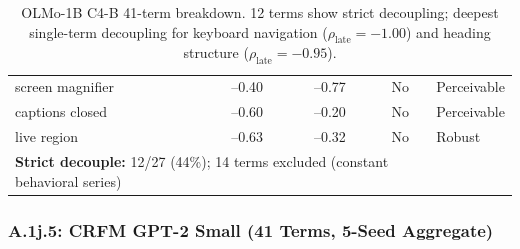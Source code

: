 \documentclass[10pt]{article} %
\begin{document}
\begin{table}[H]
\begin{tabular}{|l|c|c|c|l|}
screen magnifier & --0.40 & --0.77 & No & Perceivable \\
captions closed & --0.60 & --0.20 & No & Perceivable \\
live region & --0.63 & --0.32 & No & Robust \\
\hline
\multicolumn{4}{|l|}{\textbf{Strict decouple:} 12/27 (44\%); 14 terms excluded (constant behavioral series)} \\
\hline
\end{tabular}
\caption{OLMo-1B C4-B 41-term breakdown. 12 terms show strict decoupling; deepest single-term decoupling for keyboard navigation ($\rho_\text{late}=-1.00$) and heading structure ($\rho_\text{late}=-0.95$).}
\end{table}

\subsubsection*{A.1j.5: CRFM GPT-2 Small (41 Terms, 5-Seed Aggregate)}
\end{document}

